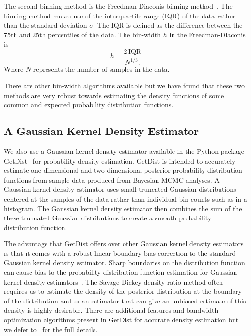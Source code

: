 The second binning method is the Freedman-Diaconis binning method~\cite{Freedman1981}. The binning method makes use of the interquartile range (IQR) of the data rather than the standard deviation $\sigma$. The IQR is defined as the difference between the $75$th and $25$th percentiles of the data. The bin-width $h$ in the Freedman-Diaconis is
\begin{equation}
    h = \frac{2 \, \mathrm{IQR}}{N^{1/3}.}
\end{equation}
Where $N$ represents the number of samples in the data.

There are other bin-width algorithms available but we have found that these two methods are very robust towards estimating the density functions of some common and expected probability distribution functions.

\subsection{A Gaussian Kernel Density Estimator}
We also use a Gaussian kernel density estimator available in the Python package GetDist~\citep{lewis2015getdist} for probability density estimation. GetDist is intended to accurately estimate one-dimensional and two-dimensional posterior probability distribution functions from sample data produced from Bayesian MCMC analyses. A Gaussian kernel density estimator uses small truncated-Gaussian distributions centered at the samples of the data rather than individual bin-counts such as in a histogram. The Gaussian kernel density estimator then combines the sum of the these truncated Gaussian distributions to create a smooth probability distribution function.

The advantage that GetDist offers over other Gaussian kernel density estimators is that it comes with a robust linear-boundary bias correction to the standard Gaussian kernel density estimator. Sharp boundaries on the distribution function can cause bias to the probability distribution function estimation for Gaussian kernel density estimators~\citep{lewis2015getdist}. The Savage-Dickey density ratio method often requires us to estimate the density of the posterior distribution at the boundary of the distribution and so an estimator that can give an unbiased estimate of this density is highly desirable. There are additional features and bandwidth optimization algorithms present in GetDist for accurate density estimation but we defer to~\cite{lewis2015getdist} for the full details.

